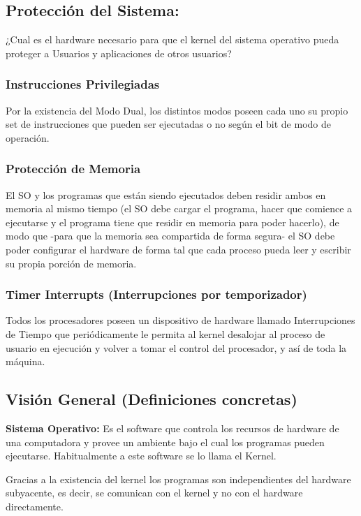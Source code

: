 \documentclass[../main.tex]{subfiles}
\begin{document}
    \subsection{Protección del Sistema:}
        ¿Cual es el hardware necesario para que el kernel del sistema operativo pueda proteger a Usuarios y aplicaciones de otros usuarios?

        \subsubsection*{Instrucciones Privilegiadas}
            Por la existencia del Modo Dual, los distintos modos poseen cada uno su propio set de instrucciones que pueden ser ejecutadas o no según el bit de modo de operación.
            
        \subsubsection*{Protección de Memoria}
            El SO y los programas que están siendo ejecutados deben residir ambos en memoria al mismo tiempo (el SO debe cargar el programa, hacer que comience a ejecutarse y el programa tiene que residir en memoria para poder hacerlo), de modo que -para que la memoria sea compartida de forma segura- el SO debe poder configurar el hardware de forma tal que cada proceso pueda leer y escribir su propia porción de memoria.
        
        \subsubsection*{Timer Interrupts (Interrupciones por temporizador)}
            Todos los procesadores poseen un dispositivo de hardware llamado Interrupciones de Tiempo que periódicamente le permita al kernel desalojar al proceso de usuario en ejecución y volver a tomar el control del procesador, y así de toda la máquina.

    \subsection{Visión General (Definiciones concretas)}
        \textbf{Sistema Operativo:} Es el software que controla los recursos de hardware de una computadora y provee un ambiente bajo el cual los programas pueden ejecutarse. Habitualmente a este software se lo llama el Kernel.

        Gracias a la existencia del kernel los programas son independientes del hardware subyacente, es decir, se comunican con el kernel y no con el hardware directamente.  
\end{document}
